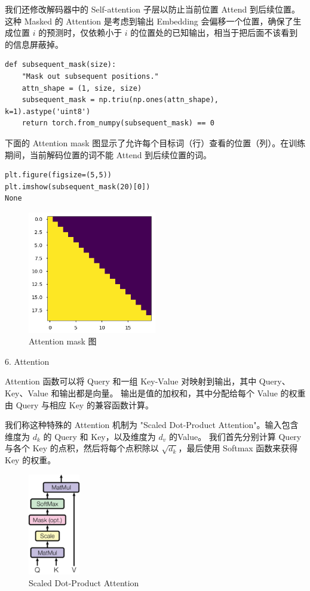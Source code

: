 我们还修改解码器中的 Self-attention 子层以防止当前位置 Attend 到后续位置。这种 Masked 的 Attention 是考虑到输出 Embedding 会偏移一个位置，确保了生成位置 $i$ 的预测时，仅依赖小于 $i$ 的位置处的已知输出，相当于把后面不该看到的信息屏蔽掉。

\begin{Verbatim}
def subsequent_mask(size):
    "Mask out subsequent positions."
    attn_shape = (1, size, size)
    subsequent_mask = np.triu(np.ones(attn_shape), k=1).astype('uint8')
    return torch.from_numpy(subsequent_mask) == 0
\end{Verbatim}

下面的 Attention mask 图显示了允许每个目标词（行）查看的位置（列）。在训练期间，当前解码位置的词不能 Attend 到后续位置的词。

\begin{Verbatim}
plt.figure(figsize=(5,5))
plt.imshow(subsequent_mask(20)[0])
None
\end{Verbatim}

\begin{figure}[htb]
\centering 
\includegraphics[width=0.5\textwidth]{img/n2.png} 
\caption{Attention mask 图}
\label{Test}
\end{figure}

6. Attention

Attention 函数可以将 Query 和一组 Key-Value 对映射到输出，其中 Query、Key、Value 和输出都是向量。 输出是值的加权和，其中分配给每个 Value 的权重由 Query 与相应 Key 的兼容函数计算。

我们称这种特殊的 Attention 机制为 "Scaled Dot-Product Attention"。输入包含维度为 $d_{k}$ 的 Query 和 Key，以及维度为 $d_v$ 的Value。 我们首先分别计算 Query 与各个 Key 的点积，然后将每个点积除以 $\sqrt{d_k}$，最后使用 Softmax 函数来获得 Key 的权重。

\begin{figure}[htb]
\centering 
\includegraphics[width=0.2\textwidth]{img/n3.png} 
\caption{Scaled Dot-Product Attention}
\label{Test}
\end{figure}

